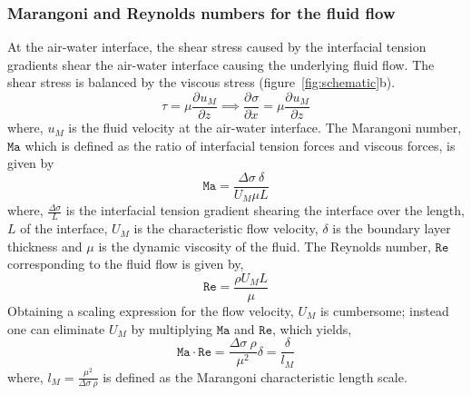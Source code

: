 \documentclass[journal=langd5, manuscript=article, layout=onecolumn]{achemso}
\newcommand{\pdc}[3][]{\frac{\partial^{#1} #2}{\partial #3^{#1}}} %
\begin{document}
\subsubsection{Marangoni and Reynolds numbers for the fluid flow}
At the air-water interface, the shear stress caused by the interfacial tension gradients shear the air-water interface causing the underlying fluid flow. The shear stress is balanced by the viscous stress (figure~\ref{fig:schematic}b).
\begin{equation*}
\tau = \mu \pdc{u_{M}}{z} 
\implies \pdc{\sigma}{x} = \mu \pdc{u_{M}}{z}
\end{equation*} 
where, $u_{M}$ is the fluid velocity at the air-water interface. The Marangoni number, $\mathtt{Ma}$ which is defined as the ratio of interfacial tension forces and viscous forces, is given by
\begin{equation}\label{eq:numberMa}
\mathtt{Ma} = \frac{\Delta\sigma\ \delta}{U_{M} \mu L}
\end{equation}
where, $\frac{\Delta\sigma}{L}$ is the interfacial tension gradient shearing the interface over the length, $L$ of the interface, $U_{M}$ is the characteristic flow velocity, $\delta$ is the boundary layer thickness and $\mu$ is the dynamic viscosity of the fluid. The Reynolds number, $\mathtt{Re}$ corresponding to the fluid flow is given by,
\begin{equation}\label{eq:numberRe}
\mathtt{Re} = \frac{\rho U_{M} L}{\mu}
\end{equation}
Obtaining a scaling expression for the flow velocity, $U_{M}$ is cumbersome; instead one can eliminate $U_{M}$ by multiplying $\mathtt{Ma}$ and $\mathtt{Re}$, which yields,
\begin{equation}
\mathtt{Ma} \cdot \mathtt{Re} = \frac{\Delta\sigma\ \rho}{\mu^{2}} \delta = \frac{\delta}{l_{M}}
\end{equation}
where, $l_{M} = \frac{\mu^{2}}{\Delta\sigma\ \rho}$ is defined as the Marangoni characteristic length scale. %
\end{document}
